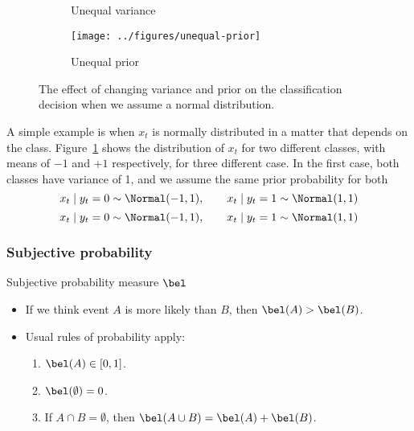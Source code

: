 \begin{frame}
\begin{figure}[H]
\begin{subfigure}{\fwidth}
      \caption{Unequal variance}
    \end{subfigure}
    \begin{subfigure}{\fwidth}
      \texttt{[image: ../figures/unequal-prior]}
      \caption{Unequal prior}
    \end{subfigure}
    \caption{The effect of changing variance and prior on the classification decision when we assume a normal distribution.}
    \label{fig:normal-generative}
  \end{figure}
    \begin{example}
      A simple example is when $x_t$ is normally distributed in a matter that depends on the class.  Figure~\ref{fig:normal-generative} shows the distribution of $x_t$ for two different classes, with means of $-1$ and $+1$ respectively, for three different case. In the first case, both classes have variance of 1, and we assume the same prior probability for both
      \[
      x_t \mid y_t = 0 \sim \Normal(-1,1),
      \qquad
      x_t \mid y_t = 1 \sim \Normal(1,1)
      \]
      \[
      x_t \mid y_t = 0 \sim \Normal(-1,1),
      \qquad
      x_t \mid y_t = 1 \sim \Normal(1,1)
      \]

    \end{example}
  
\end{frame}


\begin{frame}
  \frametitle{Subjective probability}
  \begin{block}{Subjective probability measure $\bel$}
    \begin{itemize}
    \item If we think event $A$ is more likely than $B$, then $\bel(A) > \bel(B)$.
    \item Usual rules of probability apply:
      \begin{enumerate}
      \item $\bel(A) \in [0,1]$.
      \item $\bel(\emptyset) = 0$.
      \item If $A \cap B = \emptyset$, then $\bel(A \cup B) = \bel(A) + \bel(B)$.
      \end{enumerate}
    \end{itemize}
  \end{block}
\end{frame}


